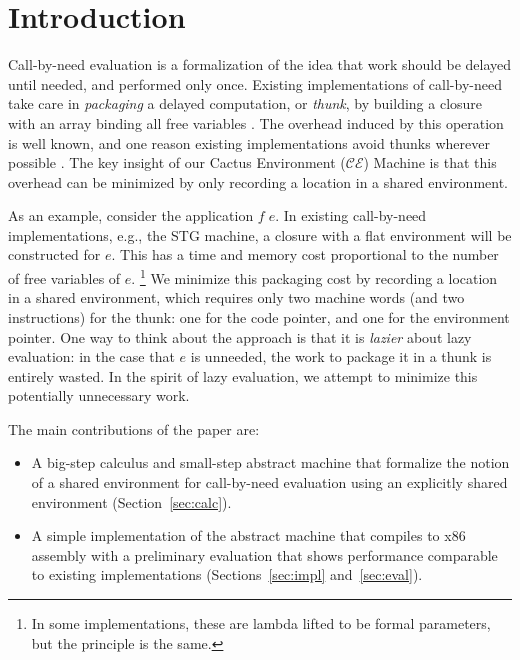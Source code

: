 \section{Introduction}

Call-by-need evaluation is a formalization of the idea that work
should be delayed until needed, and performed only once.  Existing
implementations of call-by-need take care in \emph{packaging} a delayed
computation, or \emph{thunk}, by building a closure with an array binding all
free variables \cite{jonesstg,boquist1997grin}. The overhead induced by this
operation is well known, and one reason existing implementations avoid thunks
wherever possible \cite{johnsson1984efficient}. The key insight of our
Cactus Environment ($\mathcal{CE}$) Machine is that this overhead can be
minimized by only recording a location in a shared environment.

As an example, consider the application $f \; e$. In existing call-by-need
implementations, e.g., the STG machine\cite{jonesstg}, a closure with a flat
environment will be constructed for $e$.  This has a time and memory cost
proportional to the number of free variables of $e$. \footnote{In some
implementations, these are lambda lifted to be formal parameters, but the
principle is the same.} We minimize this packaging cost by recording a
location in a shared environment, which requires only two
machine words (and two instructions) for the thunk: one for the code pointer,
and one for the environment pointer. One way to think about the approach is that
it is \emph{lazier} about lazy evaluation: in the case that $e$ is unneeded, the
work to package it in a thunk is entirely wasted. In the spirit of lazy
evaluation, we attempt to minimize this potentially unnecessary work.  

The main contributions of the paper are:
\begin{itemize}
\item A big-step calculus and small-step abstract machine that formalize the
notion of a shared environment for call-by-need evaluation using an explicitly
shared environment (Section~\ref{sec:calc}).
\item A simple implementation of the abstract machine that compiles to x86
assembly with a preliminary evaluation that shows performance comparable to
existing implementations (Sections~\ref{sec:impl} and~\ref{sec:eval}).
\end{itemize}

